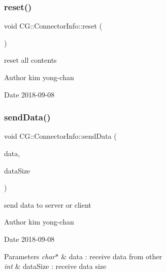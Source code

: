 \subsubsection{\texorpdfstring{reset()}{reset()}}
{\footnotesize\ttfamily void C\+G\+::\+Connector\+Info\+::reset (\begin{DoxyParamCaption}{ }\end{DoxyParamCaption})\hspace{0.3cm}{\ttfamily [protected]}}



reset all contents 

\begin{DoxyAuthor}{Author}
kim yong-\/chan 
\end{DoxyAuthor}
\begin{DoxyDate}{Date}
2018-\/09-\/08 
\end{DoxyDate}
\mbox{\label{class_c_g_1_1_connector_info_a6d67b0192c2039eba12bf2ca1354a9d9}} 
\subsubsection{\texorpdfstring{send\+Data()}{sendData()}}
{\footnotesize\ttfamily void C\+G\+::\+Connector\+Info\+::send\+Data (\begin{DoxyParamCaption}\item[{const char $\ast$}]{data,  }\item[{int}]{data\+Size }\end{DoxyParamCaption})}



send data to server or client 

\begin{DoxyAuthor}{Author}
kim yong-\/chan 
\end{DoxyAuthor}
\begin{DoxyDate}{Date}
2018-\/09-\/08 
\end{DoxyDate}

\begin{DoxyParams}{Parameters}
{\em char$\ast$} & data \+: receive data from other \\
\hline
{\em int} & data\+Size \+: receive data size \\
\hline
\end{DoxyParams}


